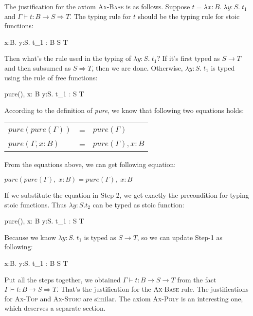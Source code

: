 The justification for the axiom \textsc{Ax-Base} is as
follows. Suppose $t = \lambda x:B. \; \lambda y:S. \; t_1$ and
$\Gamma \vdash t : B \to S \Rightarrow T$. The typing rule for $t$
should be the typing rule for stoic functions:

{ \Gamma \vdash \lambda x:B. \lambda y:S. \; t_1 : B \to S \Rightarrow T }

Then what's the rule used in the typing of $\lambda y:S. \; t_1$? If
it's first typed as $S \to T$ and then subsumed as $S \Rightarrow T$,
then we are done. Otherwise, $\lambda y:S. \; t_1$ is typed using the
rule of free functions:

{ pure(\Gamma),\; x: B \vdash \lambda y:S. \; t_1 : S \Rightarrow T }

According to the definition of \emph{pure}, we know that following two
equations holds:

\begin{center}
\begin{tabular}{l c l}
$pure(pure(\Gamma))$ & = & $pure(\Gamma)$ \\
$pure(\Gamma, x:B)$ & = & $pure(\Gamma), x:B$
\end{tabular}
\end{center}

From the equations above, we can get following equation:

\begin{center}
  $pure(pure(\Gamma),\; x: B) = pure(\Gamma),\; x: B$
\end{center}

If we substitute the equation in Step-2, we get exactly the
precondition for typing stoic functions. Thus $\lambda y:S.t_2$ can be
typed as stoic function:

{ pure(\Gamma),\; x: B \vdash \lambda y:S. \; t_1 : S \to T }

Because we know $\lambda y:S. \; t_1$ is typed as $S \to T$, so we can
update Step-1 as following:

{ \Gamma \vdash \lambda x:B. \lambda y:S. \; t_1 : B \to S \to T }

Put all the steps together, we obtained
$\Gamma \vdash t : B \to S \to T$ from the fact
$\Gamma \vdash t : B \to S \Rightarrow T$. That's the justification
for the \textsc{Ax-Base} rule. The justifications for \textsc{Ax-Top}
and \textsc{Ax-Stoic} are similar. The axiom \textsc{Ax-Poly} is an
interesting one, which deserves a separate section.

